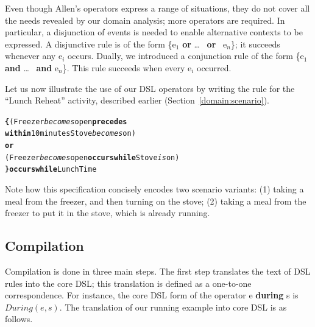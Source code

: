 Even though Allen's operators express a range of situations, they do not cover all the needs revealed by our domain analysis; more operators are required. In particular, a disjunction of events is needed to enable alternative contexts to be expressed. A disjunctive rule is of the form {\ttfamily \{e$_1$ {\bf or} \ldots~ {\bf or}~ e$_n$\}}; it succeeds whenever any {\ttfamily e$_i$} occurs. Dually, we introduced a conjunction rule of the form {\ttfamily \{e$_1$ {\bf and} \ldots~ {\bf and} e$_n$\}}. This rule succeeds when every {\ttfamily e$_i$} occurred. 


Let us now illustrate the use of our DSL operators by writing the rule for the ``Lunch Reheat'' activity, described earlier (Section~\ref{domain:scenario}). 

\footnotesize
\begin{alltt}
{\bf \{} ( Freezer {\itshape becomes} open {\bf precedes} 
    {\bf within} 10 minutes Stove {\itshape becomes} on )
  {\bf or}
  ( Freezer {\itshape becomes} open {\bf occurs while} Stove{\itshape is} on )
{\bf \} occurs while} LunchTime
\end{alltt}
\normalsize

Note how this specification concisely encodes two scenario variants: (1) taking a meal from the freezer, and then turning on the stove;
(2) taking a meal from the freezer to put it in the stove, which is already running.

\subsection{Compilation}\label{dsl:compilation}
Compilation is done in three main steps. The first step translates the text of DSL rules into the core DSL; this translation is defined as a one-to-one correspondence. 
For instance, the core DSL form of the operator {\ttfamily e {\bf during} s} is $During(e,s)$. The translation of our running example into core DSL is as follows.

